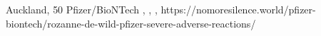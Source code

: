           {
            Auckland, 
          }
          {
            50
          }
          {
            Pfizer/BioNTech
          }
          {
          }
          {
            ,
            ,
            ,
          }
          {
            https://nomoresilence.world/pfizer-biontech/rozanne-de-wild-pfizer-severe-adverse-reactions/
          }

